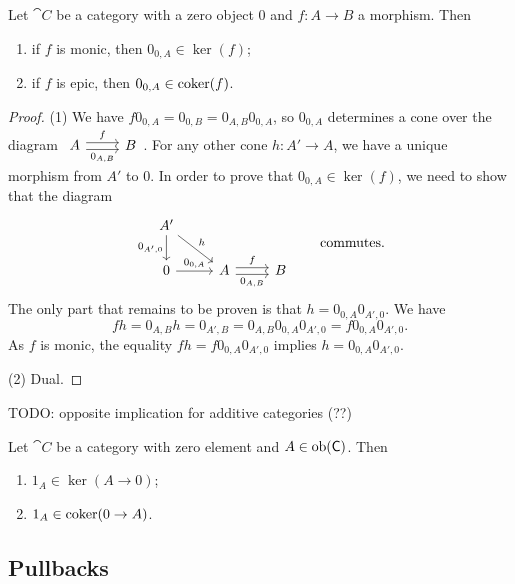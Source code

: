 \begin{proposition} \label{epicMonicZeroKernelCokernel}
Let $\cat{C}$ be a category with a zero object $0$ and $f:A\to B$ a morphism. Then
\begin{enumerate}
\item if $f$ is monic, then $0_{0,A}\in \ker(f)$;
\item if $f$ is epic, then $0_{0,A}\in \operatorname{coker}(f)$.
\end{enumerate}
\end{proposition}
\begin{proof}
(1) We have $f0_{0,A} = 0_{0,B} = 0_{A,B}0_{0,A}$, so $0_{0,A}$ determines a cone over the diagram $\begin{tikzcd}
A \arrow[r, shift left, "f"] \arrow[r, shift right, swap, "{0_{A,B}}"] & B
\end{tikzcd}$. For any other cone $h: A'\to A$, we have a unique morphism from $A'$ to $0$. In order to prove that $0_{0,A}\in\ker(f)$, we need to show that the diagram
\[ \begin{tikzcd}
A' \ar[d, swap, "{0_{A', 0}}"] \ar[dr, "h"] && \\
0 \ar[r, "0_{0,A}"] & A \ar[r, shift left, "f"] \ar[r, shift right, swap, "{0_{A,B}}"] & B
\end{tikzcd}\qquad\text{commutes.} \]
The only part that remains to be proven is that $h = 0_{0,A}0_{A',0}$. We have
\[ fh = 0_{A,B}h = 0_{A',B} = 0_{A,B}0_{0,A}0_{A',0} = f0_{0,A}0_{A',0}. \]
As $f$ is monic, the equality $fh = f0_{0,A}0_{A',0}$ implies $h = 0_{0,A}0_{A',0}$.

(2) Dual.
\end{proof}
TODO: opposite implication for additive categories (??)

\begin{lemma} \label{identityAsKernelCokernel}
Let $\cat{C}$ be a category with zero element and $A\in\operatorname{ob}(\mathsf{C})$. Then
\begin{enumerate}
\item $1_A \in \ker(A\to 0)$;
\item $1_A \in \operatorname{coker}(0\to A)$.
\end{enumerate} 
\end{lemma}

\subsection{Pullbacks}
\begin{definition}

\end{definition}

